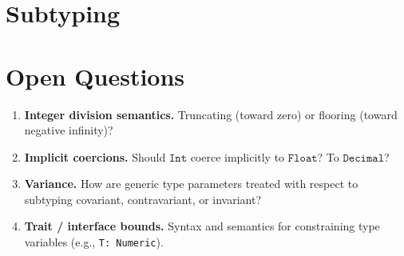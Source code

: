 \documentclass[11pt, letterpaper]{article}
\newcommand{\tInt}{\mathtt{Int}}
\newcommand{\tFloat}{\mathtt{Float}}
\newcommand{\tDecimal}{\mathtt{Decimal}}
\begin{document}

\section{Subtyping}


\section{Open Questions}
\label{sec:open}

\begin{enumerate}[label=\textbf{Q\arabic*.}]
  \item \textbf{Integer division semantics.} Truncating (toward zero) or flooring
        (toward negative infinity)?
  \item \textbf{Implicit coercions.} Should $\tInt$ coerce implicitly to
        $\tFloat$? To $\tDecimal$?
  \item \textbf{Variance.} How are generic type parameters treated with respect
        to subtyping  covariant, contravariant, or invariant?
  \item \textbf{Trait / interface bounds.} Syntax and semantics for constraining
        type variables (e.g., \lstinline|T: Numeric|).
\end{enumerate}

\end{document}

